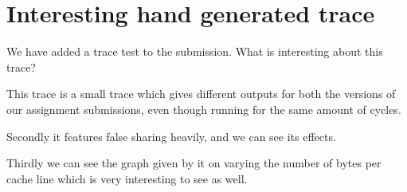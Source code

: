 \documentclass{article}
\begin{document}
\section{Interesting hand generated trace}

We have added a trace test to the submission. What is interesting about this trace? 

This trace is a small trace which gives different outputs for both the versions of our assignment submissions, even though running for the same amount of cycles.

Secondly it features false sharing heavily, and we can see its effects.

Thirdly we can see the graph given by it on varying the number of bytes per cache line which is very interesting to see as well.
\end{document}
